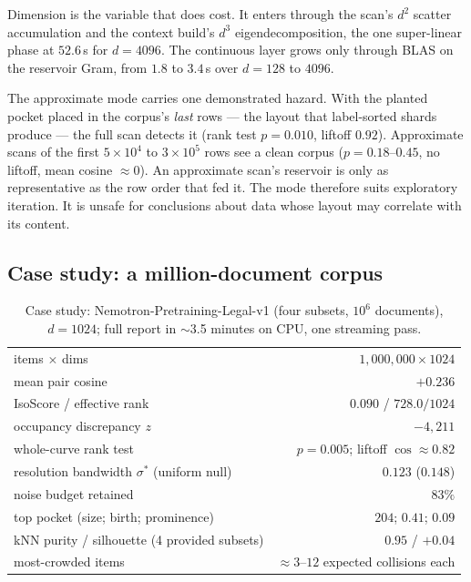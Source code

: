 \documentclass[11pt,letterpaper]{article}
\newcommand{\sstar}{\sigma^{*}}
\begin{document}
Dimension is the variable that does cost. It enters through the scan's
$d^2$ scatter accumulation and the context build's $d^3$
eigendecomposition, the one super-linear phase at $52.6$\,s for
$d = 4096$. The continuous layer grows only through BLAS on the
reservoir Gram, from $1.8$ to $3.4$\,s over $d = 128$ to $4096$.

The approximate mode carries one demonstrated hazard. With the planted
pocket placed in the corpus's \emph{last} rows --- the layout that
label-sorted shards produce --- the full scan detects it (rank test
$p = 0.010$, liftoff $0.92$). Approximate scans of the first
$5{\times}10^4$ to $3{\times}10^5$ rows see a clean corpus
($p = 0.18$--$0.45$, no liftoff, mean cosine $\approx 0$). An
approximate scan's reservoir is only as representative as the row order
that fed it. The mode therefore suits exploratory iteration. It is unsafe for
conclusions about data whose layout may correlate with its content.

\subsection{Case study: a million-document corpus}

\begin{table}[t]
\centering
\caption{Case study: Nemotron-Pretraining-Legal-v1 \cite{nemotronlegal}
(four subsets, $10^6$ documents), $d = 1024$; full report in $\sim$3.5
minutes on CPU, one streaming pass.}
\label{tab:case}
\begin{tabular}{lr}
\toprule
items $\times$ dims & $1{,}000{,}000 \times 1024$\\
mean pair cosine & $+0.236$\\
IsoScore / effective rank & $0.090$ \;/\; $728.0 / 1024$\\
occupancy discrepancy $z$ & $-4{,}211$\\
whole-curve rank test & $p = 0.005$; liftoff $\cos \approx 0.82$\\
resolution bandwidth $\sstar$ (uniform null) & $0.123$ \;($0.148$)\\
noise budget retained & $83\%$\\
top pocket (size; birth; prominence) & $204$; $0.41$; $0.09$\\
kNN purity / silhouette (4 provided subsets) & $0.95$ \;/\; $+0.04$\\
most-crowded items & $\approx 3$--$12$ expected collisions each\\
\bottomrule
\end{tabular}
\end{table}
\end{document}
